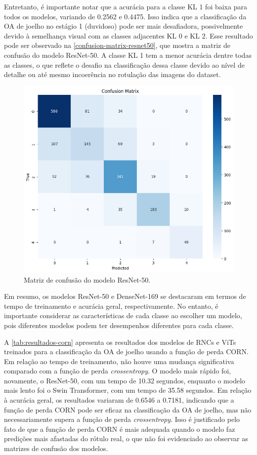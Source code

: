 Entretanto, é importante notar que a acurácia para a classe KL 1 foi baixa para todos os modelos, variando de 0.2562 e 0.4475. Isso indica que a classificação da OA de joelho no estágio 1 (duvidoso) pode ser mais desafiadora, possivelmente devido à semelhança visual com as classes adjacentes KL 0 e KL 2. Esse resultado pode ser observado na \autoref{confusion-matrix-resnet50}, que mostra a matriz de confusão do modelo ResNet-50. A classe KL 1 tem a menor acurácia dentre todas as classes, o que reflete o desafio na classificação dessa classe devido ao nível de detalhe ou até mesmo incoerência no rotulação das imagens do dataset.

\begin{figure}[h]
    \centering
    \includegraphics[width=\linewidth]{figs/confusion-matrix-resnet50.png}
    \caption{Matriz de confusão do modelo ResNet-50.}
    \label{confusion-matrix-resnet50}
\end{figure}

Em resumo, os modelos ResNet-50 e DenseNet-169 se destacaram em termos de tempo de treinamento e acurácia geral, respectivamente. No entanto, é importante considerar as características de cada classe ao escolher um modelo, pois diferentes modelos podem ter desempenhos diferentes para cada classe.

A \autoref{tab:resultados-corn} apresenta os resultados dos modelos de RNCs e ViTs treinados para a classificação da OA de joelho usando a função de perda CORN. Em relação ao tempo de treinamento, não houve uma mudança significativa comparado com a função de perda \textit{crossentropy}. O modelo mais rápido foi, novamente, o ResNet-50, com um tempo de 10.32 segundos, enquanto o modelo mais lento foi o Swin Transformer, com um tempo de 35.58 segundos. Em relação à acurácia geral, os resultados variaram de 0.6546 a 0.7181, indicando que a função de perda CORN pode ser eficaz na classificação da OA de joelho, mas não necessariamente supera a função de perda \textit{crossentropy}. Isso é justificado pelo fato de que a função de perda CORN é mais adequada quando o modelo faz predições mais afastadas do rótulo real, o que não foi evidenciado ao observar as matrizes de confusão dos modelos.


